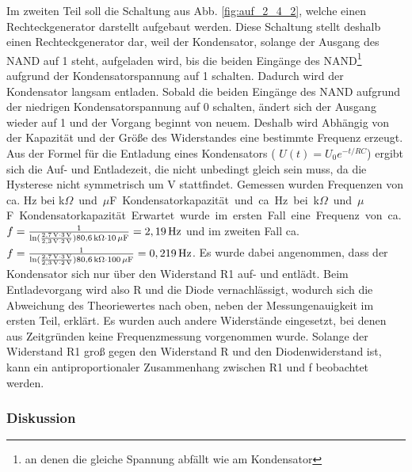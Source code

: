\documentclass[12pt,a4paper]{article}
\begin{document}
Im zweiten Teil soll die Schaltung aus Abb. \ref{fig:auf_2_4_2}, welche einen Rechteckgenerator darstellt aufgebaut werden. Diese Schaltung stellt deshalb einen Rechteckgenerator dar, weil der Kondensator, solange der Ausgang des NAND auf 1 steht, aufgeladen wird, bis die beiden Eingänge des NAND\footnote{an denen die gleiche Spannung abfällt wie am Kondensator} aufgrund der Kondensatorspannung auf 1 schalten. Dadurch wird der Kondensator langsam entladen. Sobald die beiden Eingänge des NAND aufgrund der niedrigen Kondensatorspannung auf 0 schalten, ändert sich der Ausgang wieder auf 1 und der Vorgang beginnt von neuem. Deshalb wird Abhängig von der Kapazität und der Größe des Widerstandes eine bestimmte Frequenz erzeugt. Aus der Formel für die Entladung eines Kondensators ( $U(t) = U_0e^{-t/RC}$) ergibt sich die Auf- und Entladezeit, die nicht unbedingt gleich sein muss, da die Hysterese nicht symmetrisch um \unit[2,5]{V} stattfindet. Gemessen wurden Frequenzen von ca. \unit[1,8]{Hz} bei \unit[80,6]{k$\Omega$} und \unit[10]{$\mu$F} Kondensatorkapazität und ca. \unit[0,18]{Hz} bei \unit[40,2]{k$\Omega$} und \unit[100]{$\mu$F} Kondensatorkapazität. Erwartet wurde im ersten Fall eine Frequenz von ca. $f= \frac{1}{\ln(\frac{\unit[2,7]{V}\cdot \unit[3]{V}}{\unit[2,3]{V}\cdot \unit[2]{V}})\unit[80,6]{k\Omega}\cdot\unit[10]{\mu F}} = \unit[2,19]{Hz}$ und im zweiten Fall ca. $f= \frac{1}{\ln(\frac{\unit[2,7]{V}\cdot \unit[3]{V}}{\unit[2,3]{V}\cdot \unit[2]{V}})\unit[80,6]{k\Omega}\cdot\unit[100]{\mu F}} = \unit[0,219]{Hz}$. Es wurde dabei angenommen, dass der Kondensator sich nur über den Widerstand R1 auf- und entlädt. Beim Entladevorgang wird also R und die Diode vernachlässigt, wodurch sich die Abweichung des Theoriewertes nach oben, neben der Messungenauigkeit im ersten Teil, erklärt. Es wurden auch andere Widerstände eingesetzt, bei denen aus Zeitgründen keine Frequenzmessung vorgenommen wurde. Solange der Widerstand R1 groß gegen den Widerstand R und den Diodenwiderstand ist, kann ein antiproportionaler Zusammenhang zwischen R1 und f beobachtet werden.  
\subsubsection*{Diskussion}
\end{document}
